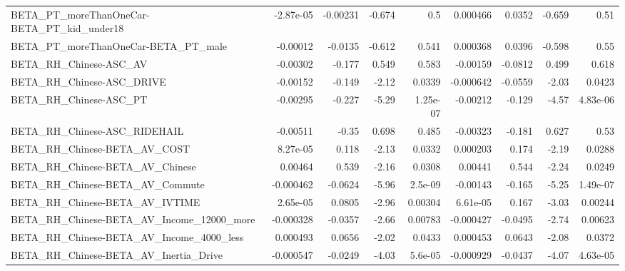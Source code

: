 \begin{tabular}{lrrrrrrrr}
BETA\_PT\_moreThanOneCar-BETA\_PT\_kid\_under18         &   -2.87e-05 &     -0.00231 &   -0.674 &      0.5 &   0.000466 &      0.0352 &       -0.659 &          0.51 \\
BETA\_PT\_moreThanOneCar-BETA\_PT\_male                &    -0.00012 &      -0.0135 &   -0.612 &    0.541 &   0.000368 &      0.0396 &       -0.598 &          0.55 \\
BETA\_RH\_Chinese-ASC\_AV                             &    -0.00302 &       -0.177 &    0.549 &    0.583 &   -0.00159 &     -0.0812 &        0.499 &         0.618 \\
BETA\_RH\_Chinese-ASC\_DRIVE                          &    -0.00152 &       -0.149 &    -2.12 &   0.0339 &  -0.000642 &     -0.0559 &        -2.03 &        0.0423 \\
BETA\_RH\_Chinese-ASC\_PT                             &    -0.00295 &       -0.227 &    -5.29 & 1.25e-07 &   -0.00212 &      -0.129 &        -4.57 &      4.83e-06 \\
BETA\_RH\_Chinese-ASC\_RIDEHAIL                       &    -0.00511 &        -0.35 &    0.698 &    0.485 &   -0.00323 &      -0.181 &        0.627 &          0.53 \\
BETA\_RH\_Chinese-BETA\_AV\_COST                       &    8.27e-05 &        0.118 &    -2.13 &   0.0332 &   0.000203 &       0.174 &        -2.19 &        0.0288 \\
BETA\_RH\_Chinese-BETA\_AV\_Chinese                    &     0.00464 &        0.539 &    -2.16 &   0.0308 &    0.00441 &       0.544 &        -2.24 &        0.0249 \\
BETA\_RH\_Chinese-BETA\_AV\_Commute                    &   -0.000462 &      -0.0624 &    -5.96 &  2.5e-09 &   -0.00143 &      -0.165 &        -5.25 &      1.49e-07 \\
BETA\_RH\_Chinese-BETA\_AV\_IVTIME                     &    2.65e-05 &       0.0805 &    -2.96 &  0.00304 &   6.61e-05 &       0.167 &        -3.03 &       0.00244 \\
BETA\_RH\_Chinese-BETA\_AV\_Income\_12000\_more          &   -0.000328 &      -0.0357 &    -2.66 &  0.00783 &  -0.000427 &     -0.0495 &        -2.74 &       0.00623 \\
BETA\_RH\_Chinese-BETA\_AV\_Income\_4000\_less           &    0.000493 &       0.0656 &    -2.02 &   0.0433 &   0.000453 &      0.0643 &        -2.08 &        0.0372 \\
BETA\_RH\_Chinese-BETA\_AV\_Inertia\_Drive              &   -0.000547 &      -0.0249 &    -4.03 &  5.6e-05 &  -0.000929 &     -0.0437 &        -4.07 &      4.63e-05 \\

\end{tabular}
